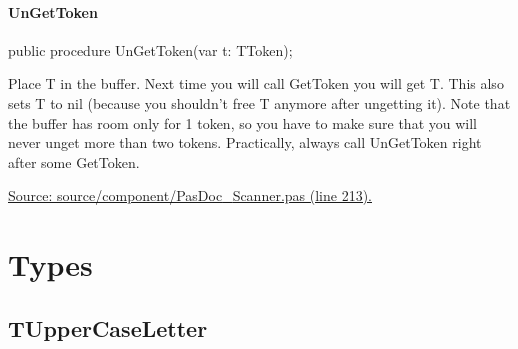 \documentclass{report}
\newif\ifpdf
\begin{document}
\paragraph*{UnGetToken}\hspace*{\fill}

\label{PasDoc_Scanner.TScanner-UnGetToken}
\begin{list}{}{
\setlength{\itemindent}{0cm}
\setlength{\listparindent}{0cm}
\setlength{\leftmargin}{\evensidemargin}
\addtolength{\leftmargin}{\tmplength}
\settowidth{\labelsep}{X}
\addtolength{\leftmargin}{\labelsep}
\setlength{\labelwidth}{\tmplength}
}
\item[\textbf{Declaration}\hfill]
\ifpdf
\begin{flushleft}
\fi
\begin{ttfamily}
public procedure UnGetToken(var t: TToken);\end{ttfamily}

\ifpdf
\end{flushleft}
\fi

\par
\item[\textbf{Description}]
Place T in the buffer. Next time you will call GetToken you will get T. This also sets T to nil (because you shouldn't free T anymore after ungetting it). Note that the buffer has room only for 1 token, so you have to make sure that you will never unget more than two tokens. Practically, always call UnGetToken right after some GetToken.\par
\href{https://github.com/pasdoc/pasdoc/blob/master/source/component/PasDoc_Scanner.pas#L213}{Source: source/component/PasDoc{\_}Scanner.pas (line 213).}

\end{list}
\section{Types}
\ifpdf
\subsection*{\large{\textbf{TUpperCaseLetter}}\normalsize\hspace{1ex}\hrulefill}
\else
\end{document}
